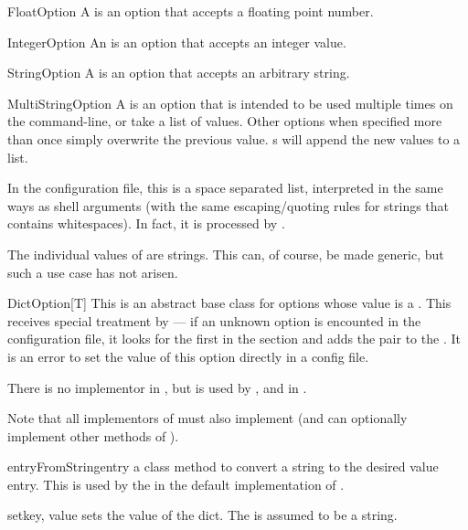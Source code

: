 \begin{classdesc}{FloatOption}{}
A  is an option that accepts a floating point number.
\end{classdesc}

\begin{classdesc}{IntegerOption}{}
An  is an option that accepts an integer value.
\end{classdesc}

\begin{classdesc}{StringOption}{}
A  is an option that accepts an arbitrary string.
\end{classdesc}

\begin{classdesc}{MultiStringOption}{}
A  is an option that is intended to be used multiple
times on the command-line, or take a list of values. Other options when
specified more than once simply overwrite the previous value.
s will append the new values to a list.

In the configuration file, this is a space separated list, interpreted in the
same ways as shell arguments (with the same escaping/quoting rules for strings
that contains whitespaces). In fact, it is processed by .

The individual values of  are strings. This can, of
course, be made generic, but such a use case has not arisen.
\end{classdesc}

\begin{classdesc}{DictOption[T]}{}
  This is an abstract base class for options whose value is a
  . This receives special treatment by
   --- if an unknown option is encounted in the
  configuration file, it looks for the first  in the section
  and adds the  pair to the . It is an error
  to set the value of this option directly in a config file.

  There is no implementor in , but is used by
  ,  and  in
  .

  Note that all implementors of  must also implement
   (and can optionally implement other methods of
  ).
\end{classdesc}

\begin{methoddesc}[DictOption]{entryFromString}{entry}
  a class method to convert a string to the desired value entry. This is used
  by the in the default implementation of .
\end{methoddesc}

\begin{methoddesc}[DictOption]{set}{key, value}
  sets the value of the dict. The  is assumed to be a string.
\end{methoddesc}
